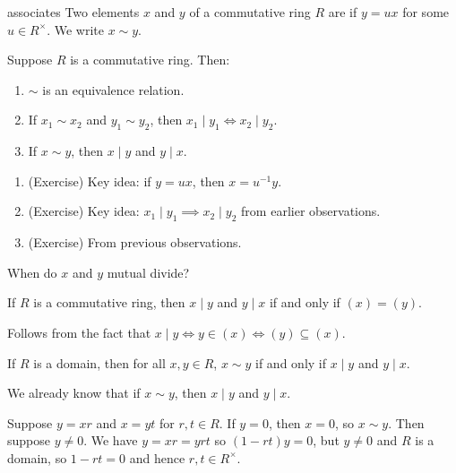 \documentclass[12pt,letterpaper]{report}
\begin{document}
\begin{defn}{associates}{}
  Two elements $x$ and $y$ of a commutative ring $R$ are  if $y = ux$ for some
  $u \in R^\times$.
  We write $x \sim y$.
\end{defn}

\begin{lem}{}{}
  Suppose $R$ is a commutative ring.
  Then:
  \begin{enumerate}
    \item $\sim$ is an equivalence relation.
    \item If $x_1 \sim x_2$ and $y_1 \sim y_2$, then $x_1 \mid y_1 \iff x_2 \mid y_2$.
    \item If $x \sim y$, then $x \mid y$ and $y \mid x$.
  \end{enumerate}
\end{lem}

\begin{thmproof}
  \begin{enumerate}
    \item (Exercise) Key idea: if $y = ux$, then $x = u^{-1}y$.
    \item (Exercise) Key idea: $x_1 \mid y_1 \implies x_2 \mid y_2$ from earlier observations.
    \item (Exercise) From previous observations.
  \end{enumerate}
\end{thmproof}

When do $x$ and $y$ mutual divide?

\begin{lem}{}{}
  If $R$ is a commutative ring, then $x \mid y$ and $y \mid x$ if and only if $(x) = (y)$.
\end{lem}

\begin{thmproof}
  Follows from the fact that $x \mid y \iff y \in (x) \iff (y) \subseteq (x)$.
\end{thmproof}

\begin{lem}{}{}
  If $R$ is a domain, then for all $x, y \in R$, $x \sim y$ if and only if $x \mid y$ and
  $y \mid x$.
\end{lem}

\begin{thmproof}
  We already know that if $x \sim y$, then $x \mid y$ and $y \mid x$.

  Suppose $y = xr$ and $x = yt$ for $r, t \in R$.
  If $y = 0$, then $x = 0$, so $x \sim y$.
  Then suppose $y \neq 0$.
  We have $y = xr = yrt$ so $(1 - rt)y = 0$, but $y \neq 0$ and $R$ is a domain, so $1 - rt = 0$
  and hence $r, t \in R^\times$.
\end{thmproof}
\end{document}
